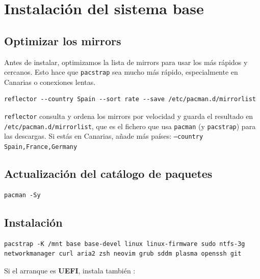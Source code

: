 \section{Instalación del sistema base}

\subsection{Optimizar los mirrors}

Antes de instalar, optimizamos la lista de mirrors para usar los más rápidos y cercanos.
Esto hace que \texttt{pacstrap} sea mucho más rápido, especialmente en Canarias o conexiones lentas.

\begin{tcolorbox}[title=Seleccionamos los mirrors más rápidos de España]
\begin{lstlisting}[style=bashstyle]
reflector --country Spain --sort rate --save /etc/pacman.d/mirrorlist
\end{lstlisting}
\tcblower
\scriptsize \texttt{reflector} consulta y ordena los mirrors por velocidad y guarda el resultado en \texttt{/etc/pacman.d/mirrorlist},
que es el fichero que usa \texttt{pacman} (y \texttt{pacstrap}) para las descargas.
Si estás en Canarias, añade más países: \texttt{--country Spain,France,Germany}
\end{tcolorbox}

\subsection{Actualización del catálogo de paquetes}
\begin{tcolorbox}[title=Primero actualizamos el catálogo de paquetes]
    \begin{lstlisting}[style=bashstyle]
    pacman -Sy
    \end{lstlisting}
\end{tcolorbox}

\subsection{Instalación}

\begin{tcolorbox}[title=Instalación del sistema base]
\begin{lstlisting}[style=bashstyle]
pacstrap -K /mnt base base-devel linux linux-firmware sudo ntfs-3g networkmanager curl aria2 zsh neovim grub sddm plasma openssh git
\end{lstlisting}
\tcblower
\small Si el arranque es \textbf{UEFI}, instala también :\quad{}
\end{tcolorbox}


